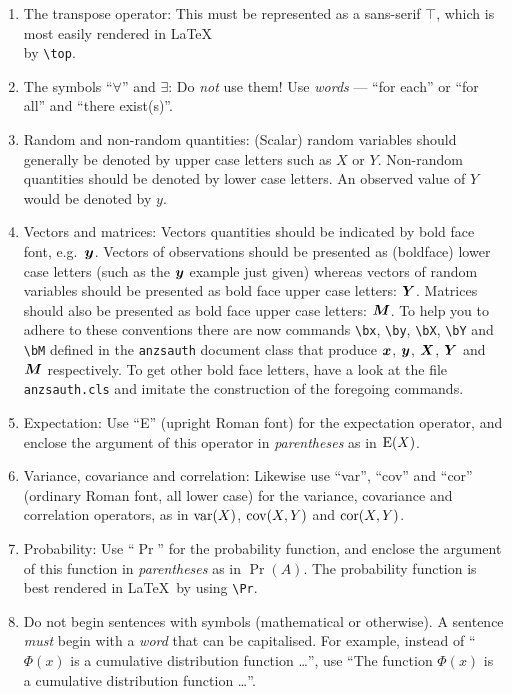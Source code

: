 \documentclass[
doublespace,
  times]{anzsauth}
\providecommand{\tightlist}{%
  \setlength{\itemsep}{0pt}\setlength{\parskip}{0pt}}\usepackage{longtable,booktabs,array}
\begin{document}
\begin{enumerate}
\def\labelenumi{\arabic{enumi}.}
\tightlist
\item
  The transpose operator: This must be represented as a sans-serif
  \(\top\), which is most easily rendered in \LaTeX\\
  by \texttt{\textbackslash{}top}.
\item
  The symbols ``\(\forall\)'' and \(\exists\): Do \emph{not} use them!
  Use \emph{words} --- ``for each'' or ``for all'' and ``there
  exist(s)''.
\item
  Random and non-random quantities: (Scalar) random variables should
  generally be denoted by upper case letters such as \(X\) or \(Y\).
  Non-random quantities should be denoted by lower case letters. An
  observed value of \(Y\) would be denoted by \(y\).
\item
  Vectors and matrices: Vectors quantities should be indicated by bold
  face font, e.g.~\(\mbox{$\boldsymbol{y}$}\). Vectors of observations should be presented
  as (boldface) lower case letters (such as the \(\mbox{$\boldsymbol{y}$}\) example just
  given) whereas vectors of random variables should be presented as bold
  face upper case letters: \(\mbox{$\boldsymbol{Y}$}\). Matrices should also be presented as
  bold face upper case letters: \(\mbox{$\boldsymbol{M}$}\). To help you to adhere to these
  conventions there are now commands \texttt{\textbackslash{}bx},
  \texttt{\textbackslash{}by}, \texttt{\textbackslash{}bX},
  \texttt{\textbackslash{}bY} and \texttt{\textbackslash{}bM} defined in
  the \texttt{anzsauth} document class that produce \(\mbox{$\boldsymbol{x}$}\), \(\mbox{$\boldsymbol{y}$}\),
  \(\mbox{$\boldsymbol{X}$}\), \(\mbox{$\boldsymbol{Y}$}\) and \(\mbox{$\boldsymbol{M}$}\) respectively. To get other bold face
  letters, have a look at the file \texttt{anzsauth.cls} and imitate the
  construction of the foregoing commands.
\item
  Expectation: Use ``E'' (upright Roman font) for the expectation
  operator, and enclose the argument of this operator in
  \emph{parentheses} as in \(\mbox{$\textrm{\textup{E}}$}(X)\). \label{op:expect}
\item
  Variance, covariance and correlation: Likewise use ``var'', ``cov''
  and ``cor'' (ordinary Roman font, all lower case) for the variance,
  covariance and correlation operators, as in \(\mbox{$\textrm{\textup{var}}$}(X)\), \(\mbox{$\textrm{\textup{cov}}$}(X,Y)\)
  and \(\mbox{$\textrm{\textup{cor}}$}(X,Y)\). \label{op:var}
\item
  Probability: Use ``\(\Pr\)'' for the probability function, and enclose
  the argument of this function in \emph{parentheses} as in \(\Pr(A)\).
  The probability function is best rendered in \LaTeX~by using
  \texttt{\textbackslash{}Pr}.
\item
  Do not begin sentences with symbols (mathematical or otherwise). A
  sentence \emph{must} begin with a \emph{word} that can be capitalised.
  For example, instead of ``\(\Phi(x)\) is a cumulative distribution
  function \ldots'', use ``The function \(\Phi(x)\) is a cumulative
  distribution function \ldots''.
\end{enumerate}
\end{document}
